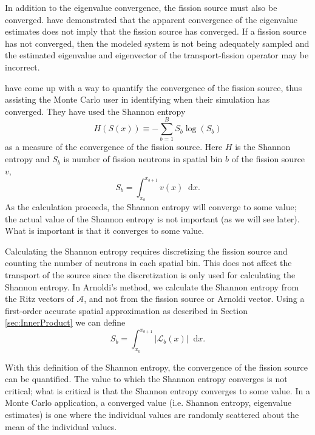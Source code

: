 \documentclass[12]{ansnse}
\newcommand{\A}{\ensuremath{\mathcal{A}}}
\newcommand{\dd}{\ensuremath{\mathop{}\!\mathrm{d}}}
\newcommand{\Lin}{\ensuremath{\mathcal{L}}}
\begin{document}
\begin{doublespace}
In addition to the eigenvalue convergence, the fission source must also be converged.  \citet{Ueki:2005Stati-0} have demonstrated that the apparent convergence of the eigenvalue estimates does not imply that the fission source has converged.  If a fission source has not converged, then the modeled system is not being adequately sampled and the estimated eigenvalue and eigenvector of the transport-fission operator may be incorrect.  

\citet{Ueki:2005Stati-0} have come up with a way to quantify the convergence of the fission source, thus assisting the Monte Carlo user in identifying when their simulation has converged.  They have used the Shannon entropy
\begin{equation}
    H\left(S(x)\right) \equiv -\sum_{b=1}^B S_b \log\left(S_b\right)
    \label{eq:ShannonEntropy}
\end{equation}
as a measure of the convergence of the fission source.  Here $H$ is the Shannon entropy and $S_b$ is number of fission neutrons in spatial bin $b$ of the fission source $v$,
\begin{equation}
    S_b = \int_{x_{b}}^{x_{b+1}} v(x) \dd x.
\end{equation}
As the calculation proceeds, the Shannon entropy will converge to some value; the actual value of the Shannon entropy is not important (as we will see later).  What is important is that it converges to some value.

Calculating the Shannon entropy requires discretizing the fission source and counting the number of neutrons in each spatial bin.  This does not affect the transport of the source since the discretization is only used for calculating the Shannon entropy.  In Arnoldi's method, we calculate the Shannon entropy from the Ritz vectors of \A, and not from the fission source or Arnoldi vector.  Using a first-order accurate spatial approximation as described in Section \ref{sec:InnerProduct} we can define
\begin{equation}
    S_b = \int_{x_b}^{x_{b+1}} \left|\Lin_b(x)\right| \dd x.
\end{equation}

With this definition of the Shannon entropy, the convergence of the fission source can be quantified.  The value to which the Shannon entropy converges is not critical; what is critical is that the Shannon entropy converges to some value.  In a Monte Carlo application, a converged value (i.e. Shannon entropy, eigenvalue estimates) is one where the individual values are randomly scattered about the mean of the individual values.


\end{doublespace}
\end{document}
